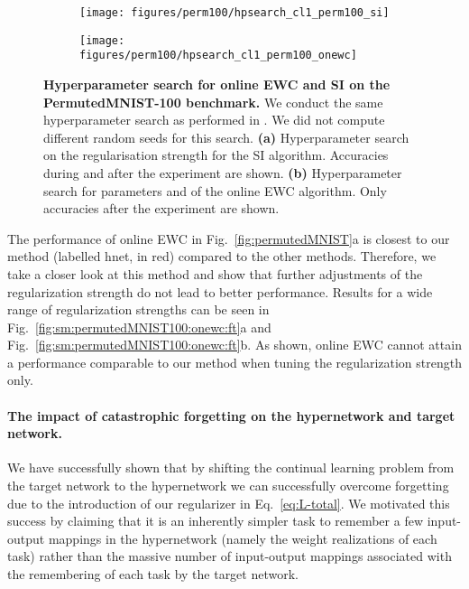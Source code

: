 \documentclass{article}
\begin{document}
\begin{figure}
    \centering
    \begin{subfigure}{0.49\linewidth}
    \caption{}
    \texttt{[image: figures/perm100/hpsearch\_cl1\_perm100\_si]}
    \end{subfigure}
    \begin{subfigure}{0.49\linewidth}
    \caption{}
    \texttt{[image: figures/perm100/hpsearch\_cl1\_perm100\_onewc]}
    \end{subfigure}
    \caption{\textbf{Hyperparameter search for online EWC and SI on the PermutedMNIST-100 benchmark.} We conduct the same hyperparameter search as performed in \cite{van_de_ven_generative_2018}. We did not compute different random seeds for this search. \textbf{(a)} Hyperparameter search on the regularisation strength  for the SI algorithm. Accuracies during and after the experiment are shown. \textbf{(b)} Hyperparameter search for parameters  and  of the online EWC algorithm. 
    Only accuracies after the experiment are shown.
    \label{fig:hp_serch_p100}}
\end{figure}

The performance of online EWC in Fig.~\ref{fig:permutedMNIST}a is closest to our method (labelled hnet, in red) compared to the other methods. Therefore, we take a closer look at this method and show that further adjustments of the regularization strength  do not lead to better performance. Results for a wide range of regularization strengths can be seen in Fig.~\ref{fig:sm:permutedMNIST100:onewc:ft}a and Fig.~\ref{fig:sm:permutedMNIST100:onewc:ft}b. As shown, online EWC cannot attain a performance comparable to our method when tuning the regularization strength only.

\paragraph{The impact of catastrophic forgetting on the hypernetwork and target network.} We have successfully shown that by shifting the continual learning problem from the target network to the hypernetwork we can successfully overcome forgetting due to the introduction of our regularizer in Eq.~\ref{eq:L-total}. We motivated this success by claiming that it is an inherently simpler task to remember a few input-output mappings in the hypernetwork (namely the weight realizations of each task) rather than the massive number of input-output mappings  associated with the remembering of each task  by the target network.
\end{document}
